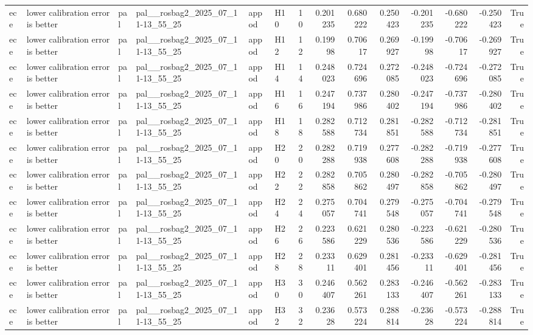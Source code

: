 \begin{longtable}{llllllrrrrrrrr}
ece & lower calibration error is better & pal & pal\_\_rosbag2\_2025\_07\_11-13\_55\_25 & appod & H10 & 10 & 0.201235 & 0.680222 & 0.250423 & -0.201235 & -0.680222 & -0.250423 & True \\
ece & lower calibration error is better & pal & pal\_\_rosbag2\_2025\_07\_11-13\_55\_25 & appod & H12 & 12 & 0.19998 & 0.70617 & 0.269927 & -0.19998 & -0.70617 & -0.269927 & True \\
ece & lower calibration error is better & pal & pal\_\_rosbag2\_2025\_07\_11-13\_55\_25 & appod & H14 & 14 & 0.248023 & 0.724696 & 0.272085 & -0.248023 & -0.724696 & -0.272085 & True \\
ece & lower calibration error is better & pal & pal\_\_rosbag2\_2025\_07\_11-13\_55\_25 & appod & H16 & 16 & 0.247194 & 0.737986 & 0.280402 & -0.247194 & -0.737986 & -0.280402 & True \\
ece & lower calibration error is better & pal & pal\_\_rosbag2\_2025\_07\_11-13\_55\_25 & appod & H18 & 18 & 0.282588 & 0.712734 & 0.281851 & -0.282588 & -0.712734 & -0.281851 & True \\
ece & lower calibration error is better & pal & pal\_\_rosbag2\_2025\_07\_11-13\_55\_25 & appod & H20 & 20 & 0.282288 & 0.719938 & 0.277608 & -0.282288 & -0.719938 & -0.277608 & True \\
ece & lower calibration error is better & pal & pal\_\_rosbag2\_2025\_07\_11-13\_55\_25 & appod & H22 & 22 & 0.282858 & 0.705862 & 0.280497 & -0.282858 & -0.705862 & -0.280497 & True \\
ece & lower calibration error is better & pal & pal\_\_rosbag2\_2025\_07\_11-13\_55\_25 & appod & H24 & 24 & 0.275057 & 0.704741 & 0.279548 & -0.275057 & -0.704741 & -0.279548 & True \\
ece & lower calibration error is better & pal & pal\_\_rosbag2\_2025\_07\_11-13\_55\_25 & appod & H26 & 26 & 0.223586 & 0.621229 & 0.280536 & -0.223586 & -0.621229 & -0.280536 & True \\
ece & lower calibration error is better & pal & pal\_\_rosbag2\_2025\_07\_11-13\_55\_25 & appod & H28 & 28 & 0.23311 & 0.629401 & 0.281456 & -0.23311 & -0.629401 & -0.281456 & True \\
ece & lower calibration error is better & pal & pal\_\_rosbag2\_2025\_07\_11-13\_55\_25 & appod & H30 & 30 & 0.246407 & 0.562261 & 0.283133 & -0.246407 & -0.562261 & -0.283133 & True \\
ece & lower calibration error is better & pal & pal\_\_rosbag2\_2025\_07\_11-13\_55\_25 & appod & H32 & 32 & 0.23628 & 0.573224 & 0.288814 & -0.23628 & -0.573224 & -0.288814 & True \\

\end{longtable}
